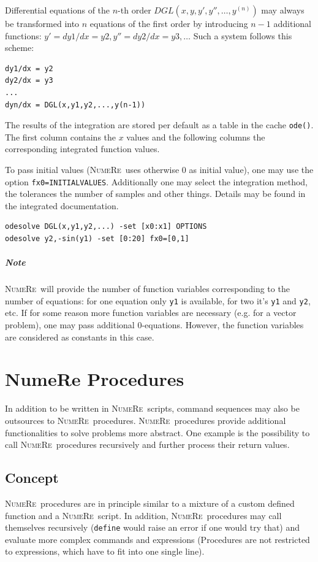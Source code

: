 \documentclass[DIV=14,headsepline,footsepline]{scrbook}
\newcommand{\NR}{\textsc{Nu\-me\-Re}}
\begin{document}
				Differential equations of the $n$-th order $DGL(x,y,y',y'',\ldots,y^{(n)})$ may always be transformed into $n$ equations of the first order by introducing $n-1$ additional functions: $y' = dy1/dx = y2, y'' = dy2/dx = y3, \ldots$ Such a system follows this scheme:
				\begin{lstlisting}
dy1/dx = y2
dy2/dx = y3
...
dyn/dx = DGL(x,y1,y2,...,y(n-1))
				\end{lstlisting}
	
				The results of the integration are stored per default as a table in the cache \verb+ode()+. The first column contains the $x$ values and the following columns the corresponding integrated function values.
				
				To pass initial values (\NR\ uses otherwise 0 as initial value), one may use the option \verb+fx0=INITIALVALUES+. Additionally one may select the integration method, the tolerances the number of samples and other things. Details may be found in the integrated documentation.
				\begin{lstlisting}
odesolve DGL(x,y1,y2,...) -set [x0:x1] OPTIONS
odesolve y2,-sin(y1) -set [0:20] fx0=[0,1]
				\end{lstlisting}
				\paragraph{Note} \NR\ will provide the number of function variables corresponding to the number of equations: for one equation only \verb+y1+ is available, for two it's \verb+y1+ and \verb+y2+, etc. If for some reason more function variables are necessary (e.g. for a vector problem), one may pass additional 0-equations. However, the function variables are considered as constants in this case.
				
		\chapter{NumeRe Procedures}
			In addition to be written in \NR\ scripts, command sequences may also be outsources to \NR\ procedures. \NR\ procedures provide additional functionalities to solve problems more abstract. One example is the possibility to call \NR\ procedures recursively and further process their return values.
			\section{Concept}
				\NR\ procedures are in principle similar to a mixture of a custom defined function and a \NR\ script. In addition, \NR\ procedures may call themselves recursively (\verb+define+ would raise an error if one would try that) and evaluate more complex commands and expressions (Procedures are not restricted to expressions, which have to fit into one single line).
				
\end{document}
